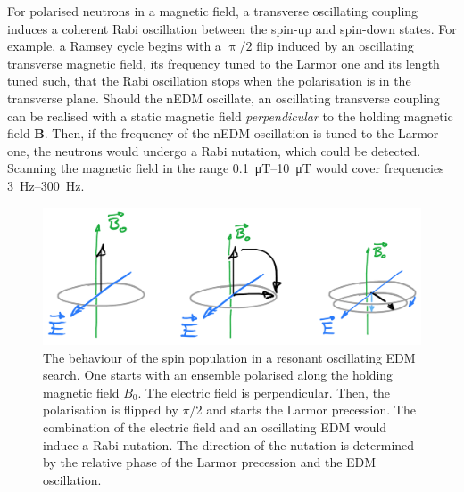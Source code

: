 
For polarised neutrons in a magnetic field, a transverse oscillating coupling induces a coherent Rabi oscillation between the spin-up and spin-down states.
For example, a Ramsey cycle begins with a $\uppi/2$ flip induced by an oscillating transverse magnetic field, its frequency tuned to the Larmor one and its length tuned such, that the Rabi oscillation stops when the polarisation is in the transverse plane. Should the nEDM oscillate, an oscillating transverse coupling can be realised with a static magnetic field \emph{perpendicular} to the holding magnetic field $\mathbf{B}$. Then, if the frequency of the nEDM oscillation is tuned to the Larmor one, the neutrons would undergo a Rabi nutation, which could be detected. Scanning the magnetic field in the range \SIrange[range-phrase=--]{0.1}{10}{\micro\tesla} would cover frequencies \SIrange[range-phrase=--]{3}{300}{\hertz}.

\begin{figure}
  \centering
  \includegraphics[width=\linewidth]{gfx/axions/resonant_effect.png}
  \caption{The behaviour of the spin population in a resonant oscillating EDM search. One starts with an ensemble polarised along the holding magnetic field $B_0$. The electric field is perpendicular. Then, the polarisation is flipped by $\pi$/2 and starts the Larmor precession. The combination of the electric field and an oscillating EDM would induce a Rabi nutation. The direction of the nutation is determined by the relative phase of the Larmor precession and the EDM oscillation.}\label{fig:axions_resonant_effect}
\end{figure}

